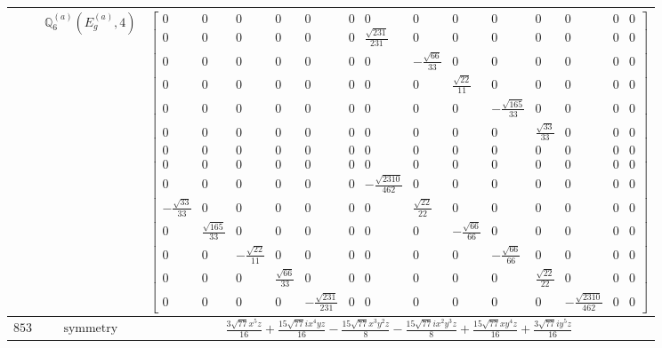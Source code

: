 \documentclass[fleqn,8pt,landscape]{jsarticle}
\begin{document}
\begin{longtable}{ccc}
$  $ & $ \mathbb{Q}_{6}^{(a)}(E_{g}^{(a)},4) $ & $ \begin{bmatrix} 0 & 0 & 0 & 0 & 0 & 0 & 0 & 0 & 0 & 0 & 0 & 0 & 0 & 0 \\ 0 & 0 & 0 & 0 & 0 & 0 & \frac{\sqrt{231}}{231} & 0 & 0 & 0 & 0 & 0 & 0 & 0 \\ 0 & 0 & 0 & 0 & 0 & 0 & 0 & - \frac{\sqrt{66}}{33} & 0 & 0 & 0 & 0 & 0 & 0 \\ 0 & 0 & 0 & 0 & 0 & 0 & 0 & 0 & \frac{\sqrt{22}}{11} & 0 & 0 & 0 & 0 & 0 \\ 0 & 0 & 0 & 0 & 0 & 0 & 0 & 0 & 0 & - \frac{\sqrt{165}}{33} & 0 & 0 & 0 & 0 \\ 0 & 0 & 0 & 0 & 0 & 0 & 0 & 0 & 0 & 0 & \frac{\sqrt{33}}{33} & 0 & 0 & 0 \\ 0 & 0 & 0 & 0 & 0 & 0 & 0 & 0 & 0 & 0 & 0 & 0 & 0 & 0 \\ 0 & 0 & 0 & 0 & 0 & 0 & 0 & 0 & 0 & 0 & 0 & 0 & 0 & 0 \\ 0 & 0 & 0 & 0 & 0 & 0 & - \frac{\sqrt{2310}}{462} & 0 & 0 & 0 & 0 & 0 & 0 & 0 \\ - \frac{\sqrt{33}}{33} & 0 & 0 & 0 & 0 & 0 & 0 & \frac{\sqrt{22}}{22} & 0 & 0 & 0 & 0 & 0 & 0 \\ 0 & \frac{\sqrt{165}}{33} & 0 & 0 & 0 & 0 & 0 & 0 & - \frac{\sqrt{66}}{66} & 0 & 0 & 0 & 0 & 0 \\ 0 & 0 & - \frac{\sqrt{22}}{11} & 0 & 0 & 0 & 0 & 0 & 0 & - \frac{\sqrt{66}}{66} & 0 & 0 & 0 & 0 \\ 0 & 0 & 0 & \frac{\sqrt{66}}{33} & 0 & 0 & 0 & 0 & 0 & 0 & \frac{\sqrt{22}}{22} & 0 & 0 & 0 \\ 0 & 0 & 0 & 0 & - \frac{\sqrt{231}}{231} & 0 & 0 & 0 & 0 & 0 & 0 & - \frac{\sqrt{2310}}{462} & 0 & 0 \end{bmatrix} $ \\ \hline
$ 853 $ & $ \text{symmetry} $ & $ \frac{3 \sqrt{77} x^{5} z}{16} + \frac{15 \sqrt{77} i x^{4} y z}{16} - \frac{15 \sqrt{77} x^{3} y^{2} z}{8} - \frac{15 \sqrt{77} i x^{2} y^{3} z}{8} + \frac{15 \sqrt{77} x y^{4} z}{16} + \frac{3 \sqrt{77} i y^{5} z}{16} $ \\

\end{longtable}
\end{document}
